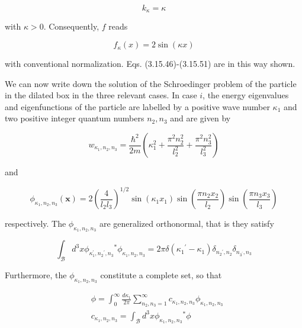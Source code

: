 \documentclass{article}
\begin{document}
\begin{equation*}
k_{\kappa}=\kappa \tag{3.15.52}
\end{equation*}
 
with $\kappa>0$. Consequently, $f$ reads
 
\begin{equation*}
f_{\kappa}(x)=2 \sin (\kappa x) \tag{3.15.53}
\end{equation*}
 
with conventional normalization. Eqs. (3.15.46)-(3.15.51) are in this way shown.

We can now write down the solution of the Schroedinger problem of the particle in the dilated box in the three relevant cases. In case $i$, the energy eigenvalues and eigenfunctions of the particle are labelled by a positive wave number $\kappa_{1}$ and two positive integer quantum numbers $n_{2}, n_{3}$ and are given by
 
\begin{equation*}
w_{\kappa_{1}, n_{2}, n_{3}}=\frac{\hbar^{2}}{2 m}\left(\kappa_{1}^{2}+\frac{\pi^{2} n_{2}^{2}}{l_{2}^{2}}+\frac{\pi^{2} n_{3}^{2}}{l_{3}^{2}}\right) \tag{3.15.54}
\end{equation*}
 
and
 
\begin{equation*}
\phi_{\kappa_{1}, n_{2}, n_{3}}(\boldsymbol{x})=2\left(\frac{4}{l_{2} l_{3}}\right)^{1 / 2} \sin \left(\kappa_{1} x_{1}\right) \sin \left(\frac{\pi n_{2} x_{2}}{l_{2}}\right) \sin \left(\frac{\pi n_{3} x_{3}}{l_{3}}\right) \tag{3.15.55}
\end{equation*}
 
respectively. The $\phi_{\kappa_{1}, n_{2}, n_{3}}$ are generalized orthonormal, that is they satisfy
 
\begin{equation*}
\int_{\mathcal{B}} d^{3} x \phi_{\kappa_{1}^{\prime}, n_{2}{ }^{\prime}, n_{3}}{ }^{*} \phi_{\kappa_{1}, n_{2}, n_{3}}=2 \pi \delta\left(\kappa_{1}{ }^{\prime}-\kappa_{1}\right) \delta_{n_{2}{ }^{\prime}, n_{2}} \delta_{n_{3^{\prime}}, n_{3}} \tag{3.15.56}
\end{equation*}
 

Furthermore, the $\phi_{\kappa_{1}, n_{2}, n_{3}}$ constitute a complete set, so that
 
\begin{align*}
& \phi=\int_{0}^{\infty} \frac{d \kappa_{1}}{2 \pi} \sum_{n_{2}, n_{3}=1}^{\infty} c_{\kappa_{1}, n_{2}, n_{3}} \phi_{\kappa_{1}, n_{2}, n_{3}}  \tag{3.15.57}\\
& c_{\kappa_{1}, n_{2}, n_{3}}=\int_{\mathcal{B}} d^{3} x \phi_{\kappa_{1}, n_{2}, n_{3}}{ }^{*} \phi \tag{3.15.58}
\end{align*}
 
\end{document}

